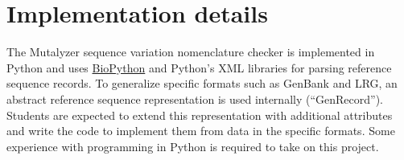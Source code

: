 \documentclass[a4paper,11pt]{article}
\begin{document}
\section*{Implementation details}

The Mutalyzer sequence variation nomenclature checker is implemented in Python
and uses \href{http://biopython.org/}{BioPython} and Python's XML libraries
for parsing reference sequence records.
To generalize specific formats such as GenBank and LRG, an abstract reference
sequence representation is used internally (``GenRecord'').
Students are expected to extend this representation with additional attributes
and write the code to implement them from data in the specific formats.
Some experience with programming in Python is required to take on this
project.



\end{document}
